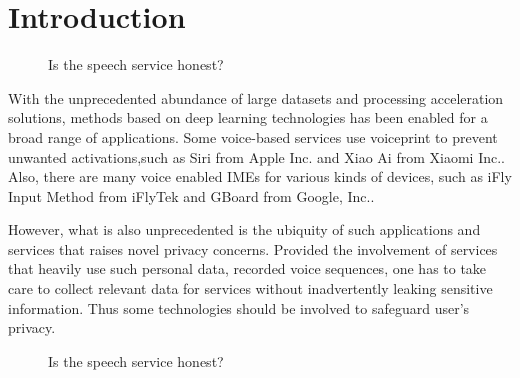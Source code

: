 \documentclass[journal]{IEEEtran} %
\begin{document}
\label{seg:intro}
\section{Introduction}

\begin{figure}[!t]
    \caption{Is the speech service honest?}
    \label{fig:dishonest_provider}
\end{figure}

With the unprecedented abundance of large datasets and processing acceleration solutions, methods based on deep learning technologies has been enabled for a broad range of applications. Some voice-based services use voiceprint to prevent unwanted activations,such as Siri from Apple Inc. and Xiao Ai from Xiaomi Inc.\cite{a19, a20}. Also, there are many voice enabled IMEs for various kinds of devices, such as iFly Input Method from iFlyTek and GBoard from Google, Inc.\cite{a21, a22}.

However, what is also unprecedented is the ubiquity of such applications and services that raises novel privacy concerns. Provided the involvement of services that heavily use such personal data, recorded voice sequences, one has to take care to collect relevant data for services without inadvertently leaking sensitive information. Thus some technologies should be involved to safeguard user's privacy.

\begin{figure}[!t]
    \caption{Is the speech service honest?}
    \label{fig:privacy_enforcement}
\end{figure}
\end{document}
